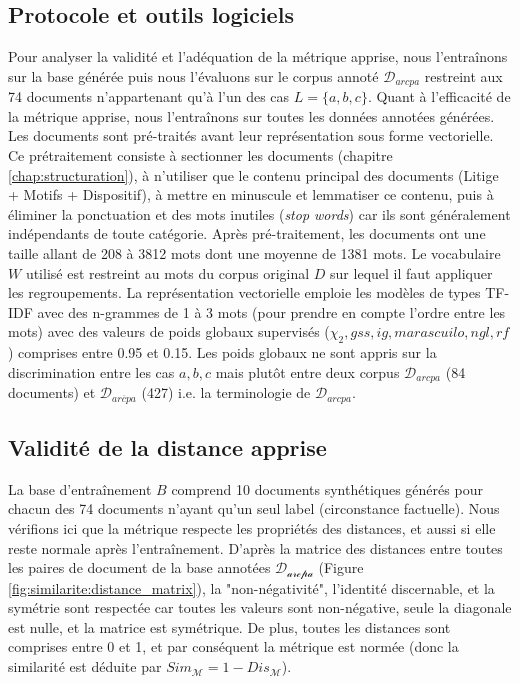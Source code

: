 \subsection{Protocole et outils logiciels}
Pour analyser la validité et l'adéquation de la métrique apprise, nous l'entraînons sur la base générée puis nous l'évaluons sur le corpus annoté $\mathcal{D}_{arcpa}$ restreint aux 74 documents n'appartenant qu'à l'un des cas $L = \lbrace a, b, c \rbrace$. Quant à l'efficacité de la métrique apprise, nous l'entraînons sur toutes les données annotées générées. Les documents sont pré-traités avant leur représentation sous forme vectorielle. Ce prétraitement consiste à sectionner les documents (chapitre \ref{chap:structuration}), à n'utiliser que le contenu principal des documents (Litige + Motifs + Dispositif), à mettre en minuscule et lemmatiser ce contenu, puis à éliminer la ponctuation et des mots inutiles (\textit{stop words})  car ils sont généralement indépendants de toute catégorie. Après pré-traitement, les documents ont une taille allant de 208 à 3812 mots dont une moyenne de 1381 mots. Le vocabulaire $W$ utilisé est restreint au mots du corpus original $D$ sur lequel il faut appliquer les regroupements. La représentation vectorielle emploie les modèles de types TF-IDF avec des n-grammes de 1 à 3 mots (pour prendre en compte l'ordre entre les mots) avec des valeurs de poids globaux supervisés ($\chi_2, gss, ig, marascuilo, ngl, rf$) comprises entre 0.95 et 0.15. Les poids globaux ne sont appris sur la discrimination entre les cas $a,b,c$ mais plutôt entre deux corpus $\mathcal{D}_{arcpa}$ (84 documents) et $\mathcal{D}_{\overline{arcpa}}$ (427) i.e. la terminologie de $\mathcal{D}_{arcpa}$.

\subsection{Validité de la distance apprise}
La base d'entraînement $B$ comprend 10 documents synthétiques générés pour chacun des 74 documents n'ayant qu'un seul label (circonstance factuelle). Nous vérifions ici que la métrique respecte les propriétés des distances, et aussi si elle reste normale après l'entraînement. D'après la matrice des distances entre toutes les paires de document de la base annotées $\mathcal{D_{\text{arcpa}}}$ (Figure \ref{fig:similarite:distance_matrix}),  la "non-négativité", l'identité discernable, et la symétrie sont respectée car toutes les valeurs sont non-négative, seule la diagonale est nulle, et la matrice est symétrique. De plus, toutes les distances sont comprises entre 0 et 1, et par conséquent la métrique est normée (donc la similarité est déduite par $Sim_\mathcal{M} = 1 - Dis_\mathcal{M}$).

